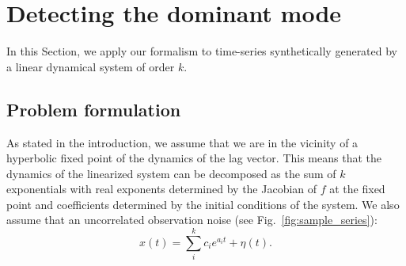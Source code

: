 \documentclass[%
 reprint,
 amsmath,amssymb,
 aps,
]{revtex4-2}
\begin{document}
\section{Detecting the dominant mode}
In this Section, we apply our formalism to time-series synthetically generated by a linear dynamical system of order $k$. 

\subsection{Problem formulation} 
As stated in the introduction, we assume that we are in the vicinity of a hyperbolic fixed point of the dynamics of the lag vector. This means that the dynamics of the linearized system can be decomposed as the sum of $k$ exponentials with real exponents determined by the Jacobian of $f$ at the fixed point and coefficients determined by the initial conditions of the system. We also assume that an uncorrelated observation noise (see Fig.~\ref{fig:sample_series}):
\begin{equation}\label{eq:series_form}
    x(t) = \sum_i^k c_i e^{a_i t} +\eta(t).
\end{equation}
\end{document}
